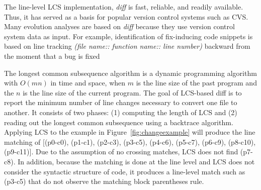 The line-level LCS implementation, \textit{diff} \cite{Hunt1977:LCS} is fast, reliable, and readily available. Thus, it has served as a basis for popular version control systems such as CVS. Many evolution analyses are based on {\it diff} because they use version control system data as input. For example, identification of fix-inducing code snippets is based on line tracking \textit{(file name:: function name:: line number)} backward from the moment that a bug is fixed~\cite{Sliwerski:2005} 

The longest common subsequence algorithm is a dynamic programming algorithm with $O(mn)$ in time and space, when $m$ is the line size of the past program and the $n$ is the line size of the current program. The goal of LCS-based diff is to report the minimum number of line changes necessary to convert one file to another. It consists of two phases: (1) computing the length of LCS and (2) reading out the longest common subsequence using a backtrace algorithm. 
Applying LCS to the example in Figure~\ref{fig:changeexample} will produce the line matching of [(p0-c0), (p1-c1), (p2-c3), (p3-c5), (p4-c6), (p5-c7), (p6-c9), (p8-c10), (p9-c11)]. Due to the assumption of no crossing matches, LCS does not find (p7-c8). In addition, because the matching is done at the line level and LCS does not consider the syntactic structure of code, it produces a line-level match such as (p3-c5) that do not observe the matching block parentheses rule. 



